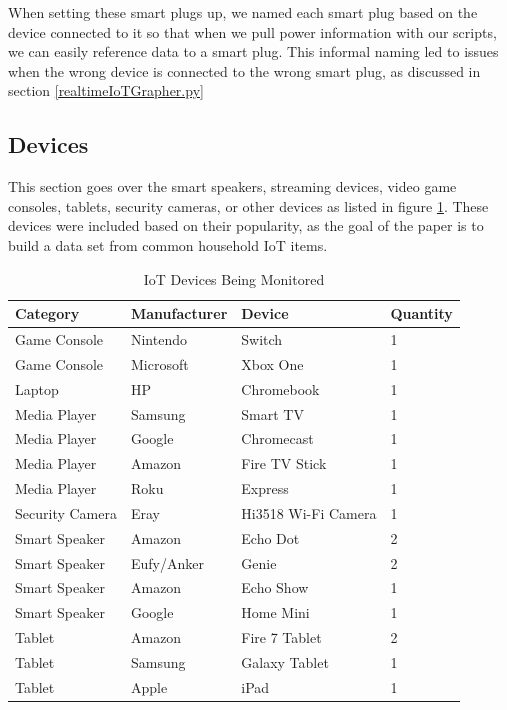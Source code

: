 When setting these smart plugs up, we named each smart plug based on the device connected to it so that when we pull power information with our scripts, we can easily reference data to a smart plug. This informal naming led to issues when the wrong device is connected to the wrong smart plug, as discussed in section \ref{realtimeIoTGrapher.py}

\subsection{Devices}
\label{Devices}
This section goes over the smart speakers, streaming devices, video game consoles, tablets, security cameras, or other devices as listed in figure \ref{tab:devices}. These devices were included based on their popularity, as the goal of the paper is to build a data set from common household IoT items.

\begin{table}[H]
    \centering
    \caption{IoT Devices Being Monitored}
    \begin{tabular}{@{}llll@{}}
    \toprule
    Category & Manufacturer & Device        & Quantity \\ \midrule
    Game Console & Nintendo     & Switch        & 1        \\
    Game Console & Microsoft    & Xbox One      & 1        \\
    Laptop & HP           & Chromebook    & 1        \\
    Media Player & Samsung      & Smart TV      & 1        \\
    Media Player & Google       & Chromecast    & 1        \\
    Media Player & Amazon       & Fire TV Stick    & 1        \\
    Media Player & Roku         & Express       & 1        \\
    Security Camera & Eray    & Hi3518 Wi-Fi Camera     & 1        \\
    Smart Speaker & Amazon       & Echo Dot      & 2        \\
    Smart Speaker & Eufy/Anker   & Genie         & 2        \\
    Smart Speaker & Amazon       & Echo Show     & 1        \\
    Smart Speaker & Google       & Home Mini     & 1        \\
    Tablet & Amazon       & Fire 7 Tablet & 2        \\
    Tablet & Samsung      & Galaxy Tablet & 1        \\
    Tablet & Apple        & iPad          & 1        \\ \bottomrule
    \end{tabular}
    \label{tab:devices}
\end{table}

